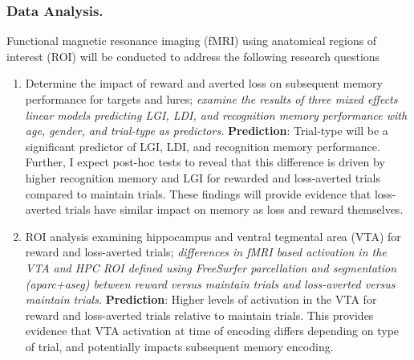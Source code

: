 \documentclass[11pt]{article}
\providecommand\citep{\cite}
\begin{document}
\subsubsection*{Data Analysis.} Functional magnetic resonance imaging (fMRI) using
anatomical regions of interest (ROI) will be conducted to address the following research
questions
\begin{enumerate}
    \item Determine the impact of reward and averted loss on subsequent memory
          performance for targets and lures; \textit{examine the results of three mixed
              effects linear models predicting LGI, LDI, and recognition memory
              performance with age, gender, and trial-type as predictors.}
            \textbf{Prediction}: Trial-type will be a significant predictor of LGI, LDI, and
            recognition memory performance. Further, I expect post-hoc tests to reveal
            that this difference is driven by higher recognition memory and LGI for
            rewarded and loss-averted trials compared to maintain trials. These findings
            will provide evidence that loss-averted trials have similar impact on memory
            as loss and reward themselves.
    \item ROI analysis examining hippocampus and ventral tegmental area (VTA) for reward
          and loss-averted trials; \textit{differences in fMRI based activation in the
              VTA and HPC ROI defined using FreeSurfer parcellation and segmentation
              (aparc+aseg) \citep{dale:99} between reward versus maintain trials and
              loss-averted versus maintain
              trials.}
            \textbf{Prediction}: Higher levels of activation in the VTA for reward and loss-averted
            trials relative to maintain trials. This provides evidence that VTA activation
            at time of encoding differs depending on type of trial, and potentially
            impacts subsequent memory encoding.
\end{enumerate}

\clearpage
{}

{}
\end{document}
